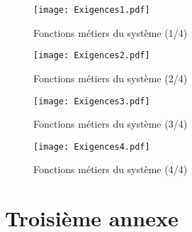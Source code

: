 \documentclass[12pt,fleqn]{book} %
\begin{document}
\begin{figure}[h!]
\centering\texttt{[image: Exigences1.pdf]}
\caption{\label{fig:exi1} Fonctions métiers du système (1/4)}
\end{figure}

\begin{figure}[h!]
\centering\texttt{[image: Exigences2.pdf]}
\caption{\label{fig:exi2} Fonctions métiers du système (2/4)}
\end{figure}

\begin{figure}[h!]
\centering\texttt{[image: Exigences3.pdf]}
\caption{\label{fig:exi3} Fonctions métiers du système (3/4)}
\end{figure}

\begin{figure}[h!]
\centering\texttt{[image: Exigences4.pdf]}
\caption{\label{fig:exi4} Fonctions métiers du système (4/4)}
\end{figure}

\chapter{Troisième annexe}

\backmatter %

%


\nocite{*}

\cleardoublepage
{}
\setlength{\columnsep}{0.75cm}
\label{sec:index}
\printindex

\cleardoublepage
{}
\setlength{\columnsep}{0.75cm}
\printglossaries

\end{document}
